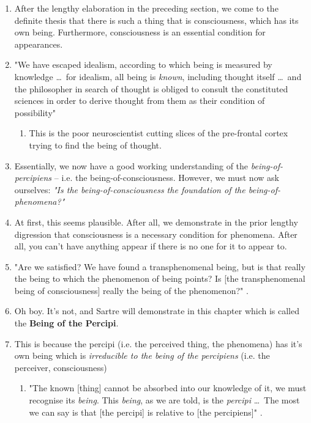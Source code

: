 \begin{enumerate}
  \item After the lengthy elaboration in the preceding section, we come to the definite thesis that there is such a thing that is consciousness, which has its own being. Furthermore, consciousness is an essential condition for appearances.
  \item "We have escaped idealism, according to which being is measured by knowledge \ldots\ for idealism, all being is \emph{known}, including thought itself \ldots\ and the philosopher in search of thought is obliged to consult the constituted sciences in order to derive thought from them as their condition of possibility" \autocite[17]{sartre}
  \begin{enumerate}
    \item This is the poor neuroscientist cutting slices of the pre-frontal cortex trying to find the being of thought.
  \end{enumerate}
  \item Essentially, we now have a good working understanding of the \emph{being-of-percipiens} -- i.e. the being-of-consciousness. However, we must now ask ourselves: \emph{"Is the being-of-consciousness the foundation of the being-of-phenomena?"}
  \item At first, this seems plausible. After all, we demonstrate in the prior lengthy digression that consciousness is a necessary condition for phenomena. After all, you can't have anything appear if there is no one for it to appear to.
  \item "Are we satisfied? We have found a transphenomenal being, but is that really the being to which the phenomenon of being points? Is [the transphenomenal being of consciousness] really the being of the phenomenon?" \autocite[17]{Sartre}.
  \item Oh boy. It's not, and Sartre will demonstrate in this chapter which is called the \textbf{Being of the Percipi}.
  \item This is because the percipi (i.e. the perceived thing, the phenomena) has it's own being which is \emph{irreducible to the being of the percipiens} (i.e. the perceiver, consciousness)
  \begin{enumerate}
    \item "The known [thing] cannot be absorbed into our knowledge of it, we must recognise its \emph{being}. This \emph{being}, as we are told, is the \emph{percipi} \ldots\ The most we can say is that [the percipi] is relative to [the percipiens]" \autocite[17]{sartre}.
  \end{enumerate}


\end{enumerate}
